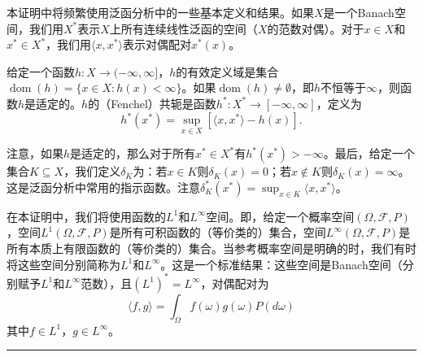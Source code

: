 \documentclass[12pt,a4paper]{article}
\newenvironment{translation}
  {\par\noindent\color{blue!70!black}\smallskip}
  {\par\medskip\hrule\medskip}
\begin{document}
\begin{translation}
本证明中将频繁使用泛函分析中的一些基本定义和结果。如果$X$是一个Banach空间，我们用$X^*$表示$X$上所有连续线性泛函的空间（$X$的范数对偶）。对于$x \in X$和$x^* \in X^*$，我们用$\langle x, x^* \rangle$表示对偶配对$x^*(x)$。

给定一个函数$h: X \to (-\infty, \infty]$，$h$的有效定义域是集合$\operatorname{dom}(h) = \{ x \in X : h(x) < \infty \}$。如果$\operatorname{dom}(h) \neq \emptyset$，即$h$不恒等于$\infty$，则函数$h$是适定的。$h$的（Fenchel）共轭是函数$h^*: X^* \to [-\infty, \infty]$，定义为
\[
h^*(x^*) = \sup_{x \in X} [\langle x, x^* \rangle - h(x)].
\]

注意，如果$h$是适定的，那么对于所有$x^* \in X^*$有$h^*(x^*) > -\infty$。最后，给定一个集合$K \subseteq X$，我们定义$\delta_K$为：若$x \in K$则$\delta_K(x) = 0$；若$x \notin K$则$\delta_K(x) = \infty$。这是泛函分析中常用的指示函数。注意$\delta_K^*(x^*) = \sup_{x \in K} \langle x, x^* \rangle$。

在本证明中，我们将使用函数的$L^1$和$L^\infty$空间。即，给定一个概率空间$(\Omega, \mathcal{F}, P)$，空间$L^1(\Omega, \mathcal{F}, P)$是所有可积函数的（等价类的）集合，空间$L^\infty(\Omega, \mathcal{F}, P)$是所有本质上有限函数的（等价类的）集合。当参考概率空间是明确的时，我们有时将这些空间分别简称为$L^1$和$L^\infty$。这是一个标准结果：这些空间是Banach空间（分别赋予$L^1$和$L^\infty$范数），且$(L^1)^* = L^\infty$，对偶配对为
\[
\langle f, g \rangle = \int_\Omega f(\omega) g(\omega) P(d\omega)
\]
其中$f \in L^1$，$g \in L^\infty$。
\end{translation}
\end{document}
